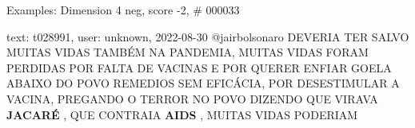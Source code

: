 \begin{frame}{Examples: Dimension 4 neg, score -2, \# 000033}
\footnotesize
\begin{alertblock}{text: t028991, user: unknown, 2022-08-30}
@jairbolsonaro DEVERIA TER SALVO MUITAS VIDAS TAMBÉM NA PANDEMIA, MUITAS VIDAS 
FORAM PERDIDAS POR FALTA DE VACINAS E POR QUERER ENFIAR GOELA ABAIXO DO POVO 
REMEDIOS SEM EFICÁCIA, POR DESESTIMULAR A VACINA, PREGANDO O TERROR NO POVO 
DIZENDO QUE VIRAVA \textbf{JACARÉ} , QUE CONTRAIA \textbf{AIDS} , MUITAS VIDAS 
PODERIAM 
\end{alertblock}
\end{frame}
